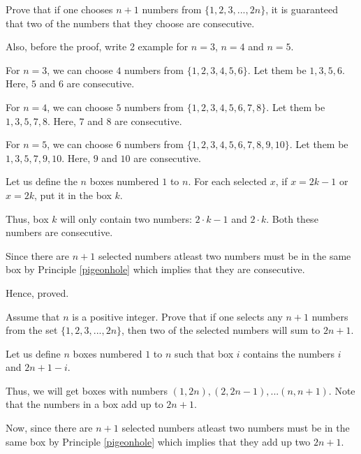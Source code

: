 \begin{problem}
	Prove that if one chooses $n+1$ numbers from $\{1, 2, 3, ..., 2n\}$, it is guaranteed that two of the numbers that they choose are consecutive.

	Also, before the proof, write 2 example for $n=3$, $n=4$ and $n=5$.
\end{problem}

\begin{scratch}
	For $n=3$, we can choose $4$ numbers from $\{1, 2, 3, 4, 5, 6\}$. Let them be $1, 3, 5, 6$. Here, $5$ and $6$ are consecutive.

	For $n=4$, we can choose $5$ numbers from $\{1, 2, 3, 4, 5, 6, 7, 8\}$. Let them be $1, 3, 5, 7, 8$. Here, $7$ and $8$ are consecutive.

	For $n=5$, we can choose $6$ numbers from $\{1, 2, 3, 4, 5, 6, 7, 8, 9, 10\}$. Let them be $1, 3, 5, 7, 9, 10$. Here, $9$ and $10$ are consecutive.
\end{scratch}

\begin{solution}
	Let us define the $n$ boxes numbered $1$ to $n$.
	For each selected $x$, if $x = 2k - 1$ or $x = 2k$, put it in the box $k$.

	Thus, box $k$ will only contain two numbers: $2 \cdot k - 1$ and $2 \cdot k$. Both these numbers are consecutive.

	Since there are $n+1$ selected numbers atleast two numbers must be in the same box by Principle \ref{pigeonhole} which implies that they are consecutive.

	Hence, proved.
\end{solution}

\begin{problem}
	Assume that $n$ is a positive integer. Prove that if one selects any $n+1$ numbers from the set $\{1, 2, 3, ..., 2n\}$, then two of the selected numbers will sum to $2n+1$.
\end{problem}

\begin{solution}
	Let us define $n$ boxes numbered $1$ to $n$ such that box $i$ contains the numbers $i$ and $2n+1-i$.
	
	Thus, we will get boxes with numbers $(1, 2n), (2, 2n-1), ... (n, n+1)$. Note that the numbers in a box add up to $2n+1$.

	Now, since there are $n+1$ selected numbers atleast two numbers must be in the same box by Principle \ref{pigeonhole} which implies that they add up two $2n+1$.
\end{solution}


